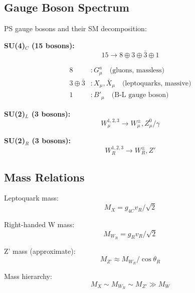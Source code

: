 \documentclass[11pt,a4paper]{article}
\theoremstyle{definition}
\begin{document}
\subsection{Gauge Boson Spectrum}
\label{subsec:gauge-spectrum}

PS gauge bosons and their SM decomposition:

\textbf{SU(4)$_C$ (15 bosons):}
\begin{equation}
  \label{eq:su4-decomp}
  15 \to 8 \oplus 3 \oplus \bar{3} \oplus 1
\end{equation}

\begin{align}
  \label{eq:gluon}
  8 &: G^a_{\mu} \quad \text{(gluons, massless)} \\
  \label{eq:leptoquark-x}
  3 \oplus \bar{3} &: X_{\mu}, \bar{X}_{\mu} \quad \text{(leptoquarks, massive)} \\
  \label{eq:bl-boson}
  1 &: B'_{\mu} \quad \text{(B-L gauge boson)}
\end{align}

\textbf{SU(2)$_L$ (3 bosons):}
\begin{equation}
  \label{eq:su2l-bosons}
  W^{1,2,3}_{\mu} \to W^{\pm}_{\mu}, Z^0_{\mu}/\gamma
\end{equation}

\textbf{SU(2)$_R$ (3 bosons):}
\begin{equation}
  \label{eq:su2r-bosons}
  W_R^{1,2,3} \to W_R^{\pm}, Z'
\end{equation}

\subsection{Mass Relations}
\label{subsec:mass-relations}

Leptoquark mass:
\begin{equation}
  \label{eq:mx-from-vr}
  M_X = g_{4C} v_R / \sqrt{2}
\end{equation}

Right-handed W mass:
\begin{equation}
  \label{eq:mwr-from-vr}
  M_{W_R} = g_R v_R / \sqrt{2}
\end{equation}

Z' mass (approximate):
\begin{equation}
  \label{eq:mzp}
  M_{Z'} \approx M_{W_R} / \cos\theta_R
\end{equation}

Mass hierarchy:
\begin{equation}
  \label{eq:mass-hier}
  M_X \sim M_{W_R} \sim M_{Z'} \gg M_W
\end{equation}
\end{document}
